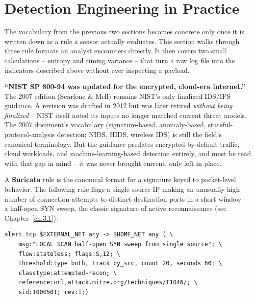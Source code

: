 \section{Detection Engineering in Practice}

The vocabulary from the previous two sections becomes concrete only once it is written down as a
rule a sensor actually evaluates. This section walks through three rule formats an analyst
encounters directly. It then covers two small calculations -- entropy and timing variance -- that
turn a raw log file into the indicators described above without ever inspecting a payload.

\begin{misconception}
\textbf{``NIST SP 800-94 was updated for the encrypted, cloud-era internet.''} The 2007 edition
(Scarfone \& Mell) remains NIST's only finalized IDS/IPS guidance. A revision was
drafted in 2012 but was later retired \emph{without being finalized} -- NIST itself noted its
inputs no longer matched current threat models. The 2007 document's vocabulary (signature-based,
anomaly-based, stateful-protocol-analysis detection; NIDS, HIDS, wireless IDS) is still the field's
canonical terminology. But the guidance predates encrypted-by-default traffic, cloud workloads, and
machine-learning-based detection entirely, and must be read with that gap in mind -- it was never
brought current, only left in place.
\end{misconception}

A \textbf{Suricata} rule is the canonical format for a signature keyed to packet-level behavior.
The following rule flags a single source IP making an unusually high number of connection attempts
to distinct destination ports in a short window -- a half-open SYN sweep, the classic signature of
active reconnaissance (see Chapter~\ref{ch:3.1}):

\begin{lstlisting}[caption={A Suricata rule detecting a SYN sweep from a single source}]
alert tcp $EXTERNAL_NET any -> $HOME_NET any ( \
    msg:"LOCAL SCAN half-open SYN sweep from single source"; \
    flow:stateless; flags:S,12; \
    threshold:type both, track by_src, count 20, seconds 60; \
    classtype:attempted-recon; \
    reference:url,attack.mitre.org/techniques/T1046/; \
    sid:1000501; rev:1;)
\end{lstlisting}

